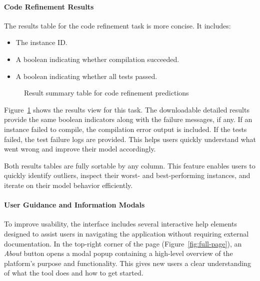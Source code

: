 \paragraph{Code Refinement Results}

The results table for the code refinement task is more concise. It includes:
\begin{itemize}
    \item The instance ID.
    \item A boolean indicating whether compilation succeeded.
    \item A boolean indicating whether all tests passed.
\end{itemize}

\begin{figure}[H]
    \centering
    \caption{Result summary table for code refinement predictions}
    \label{fig:refinement-table}
\end{figure}

Figure~\ref{fig:refinement-table} shows the results view for this task. The downloadable detailed
results provide the same boolean indicators along with the failure messages, if any. If an instance
failed to compile, the compilation error output is included. If the tests failed, the test failure
logs are provided. This helps users quickly understand what went wrong and improve their model
accordingly.

Both results tables are fully sortable by any column. This feature enables users to quickly identify
outliers, inspect their worst- and best-performing instances, and iterate on their model behavior
efficiently.

\paragraph{User Guidance and Information Modals}

To improve usability, the interface includes several interactive help elements designed to assist
users in navigating the application without requiring external documentation. In the top-right
corner of the page (Figure~\ref{fig:full-page}), an \textit{About} button opens a modal popup
containing a high-level overview of the platform's purpose and functionality. This gives new users a
clear understanding of what the tool does and how to get started.


